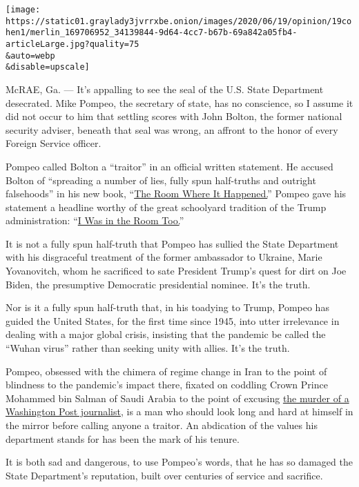 \texttt{[image: https://static01.graylady3jvrrxbe.onion/images/2020/06/19/opinion/19cohen1/merlin\_169706952\_34139844-9d64-4cc7-b67b-69a842a05fb4-articleLarge.jpg?quality=75\\\&auto=webp\\\&disable=upscale]}

McRAE, Ga. --- It's appalling to see the seal of the U.S. State
Department desecrated. Mike Pompeo, the secretary of state, has no
conscience, so I assume it did not occur to him that settling scores
with John Bolton, the former national security adviser, beneath that
seal was wrong, an affront to the honor of every Foreign Service
officer.

Pompeo called Bolton a ``traitor'' in an official written statement. He
accused Bolton of ``spreading a number of lies, fully spun half-truths
and outright falsehoods'' in his new book,
``\href{https://www.nytimes3xbfgragh.onion/2020/06/18/us/politics/john-bolton-memoir-takeaways.html}{The
Room Where It Happened.}'' Pompeo gave his statement a headline worthy
of the great schoolyard tradition of the Trump administration:
``\href{https://www.google.com/url?q=https://www.state.gov/i-was-in-the-room-too/\&sa=D\&ust=1592671298995000\&usg=AFQjCNF78FCDO-PQIapEmpDnV3UM3pH0kg}{I
Was in the Room Too.}''

It is not a fully spun half-truth that Pompeo has sullied the State
Department with his disgraceful treatment of the former ambassador to
Ukraine, Marie Yovanovitch, whom he sacrificed to sate President Trump's
quest for dirt on Joe Biden, the presumptive Democratic presidential
nominee. It's the truth.

Nor is it a fully spun half-truth that, in his toadying to Trump, Pompeo
has guided the United States, for the first time since 1945, into utter
irrelevance in dealing with a major global crisis, insisting that the
pandemic be called the ``Wuhan virus'' rather than seeking unity with
allies. It's the truth.

Pompeo, obsessed with the chimera of regime change in Iran to the point
of blindness to the pandemic's impact there, fixated on coddling Crown
Prince Mohammed bin Salman of Saudi Arabia to the point of excusing
\href{https://www.nytimes3xbfgragh.onion/2019/12/26/opinion/jamal-khashoggi-saudi-arabia.html}{the
murder of a Washington Post journalist,} is a man who should look long
and hard at himself in the mirror before calling anyone a traitor. An
abdication of the values his department stands for has been the mark of
his tenure.

It is both sad and dangerous, to use Pompeo's words, that he has so
damaged the State Department's reputation, built over centuries of
service and sacrifice.

